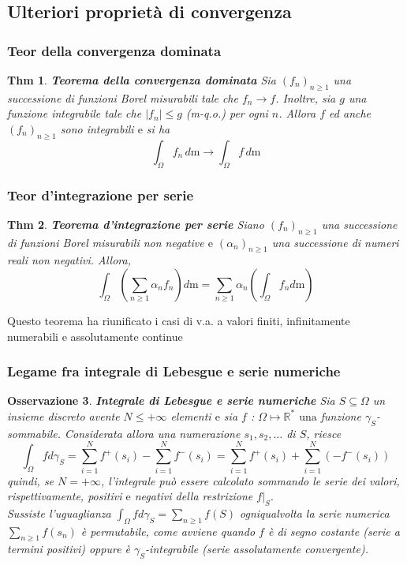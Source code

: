 \documentclass[a4paper,11pt]{article}
\theoremstyle{plain}
\newtheorem{thm}{Thm}[section]
\newtheorem{oss}[thm]{Osservazione}
\theoremstyle{definition}
\theoremstyle{remark}
\begin{document}
\subsection{Ulteriori proprietà di convergenza}
\subsubsection{Teor della convergenza dominata}
\begin{thm} \textbf{Teorema della convergenza dominata}
Sia $(f_{n})_{n\geq 1}$ una successione di funzioni Borel misurabili tale che $f_{n}\rightarrow f$. Inoltre, sia $g$ una funzione integrabile tale che $|f_{n}|\leq g$ (m-q.o.) per ogni $n$. Allora  $f$ ed anche $(f_{n})_{n\geq 1}$ sono integrabili $\mathrm{e}$ si ha
$$
\int_{\Omega}f_{n} \, d\mathrm{m}\rightarrow\int_{\Omega}f \, d\mathrm{m}
$$
\end{thm}

\subsubsection{Teor d'integrazione per serie}
\begin{thm} \textbf{Teorema d'integrazione per serie}
Siano $(f_{n})_{n\geq 1}$ una successione di funzioni Borel misurabili non negative $\mathrm{e}$ $(\alpha_{n})_{n\geq 1}$ una successione di numeri reali non negativi. Allora,
$$
\int_{\Omega}\left(\sum_{n\geq 1}\alpha_{n}f_{n} \right) d\mathrm{m}=\sum_{n\geq 1}\alpha_{n} \left( \int_{\Omega}f_{n}d\mathrm{m}\right)
$$
\end{thm}
Questo teorema ha riunificato i casi di v.a. a valori finiti, infinitamente numerabili e assolutamente continue

\subsubsection{Legame fra integrale di Lebesgue e serie numeriche}
\begin{oss} \textbf{Integrale di Lebesgue e serie numeriche} Sia $ S\subseteq\Omega$ un insieme discreto avente $ N\leq+\infty$ elementi $\mathrm{e}$ sia $f$ : $\Omega\mapsto \mathbb{R}^{*}$ $\mathrm{u}\mathrm{n}\mathrm{a}$ funzione $\gamma_{S}$-sommabile. Considerata allora una numerazione $s_{1}, s_{2}, \ldots$ di $S$, riesce
$$
\displaystyle \int_{\Omega}fd\gamma_{S}=\sum_{i=1}^{N} f^{+}(s_{i})-\sum_{i=1}^{N} f^{-}(s_{i})=\sum_{i=1}^{N} f^{+}(s_{i})+\sum_{i=1}^{N}(-f^{-}(s_{i})) 
$$
quindi, se $ N=+\infty$, l'integrale pu\`{o} essere calcolato sommando le serie dei valori, rispettivamente, positivi $\mathrm{e}$ negativi della restrizione $f|_{S}.$\\ 

\noindent
Sussiste l'uguaglianza $\displaystyle \int_{\Omega}fd\gamma_{S}=\sum_{n\geq 1}f(S)$ ogniqualvolta la serie numerica $\displaystyle \sum_{n\geq 1}f(s_{n})$ \`{e} permutabile, come avviene quando $f$ \`{e} di segno costante (serie a termini positivi) oppure \`{e} $\gamma_{S}$-integrabile (serie assolutamente convergente).
\end{oss}
\end{document}

